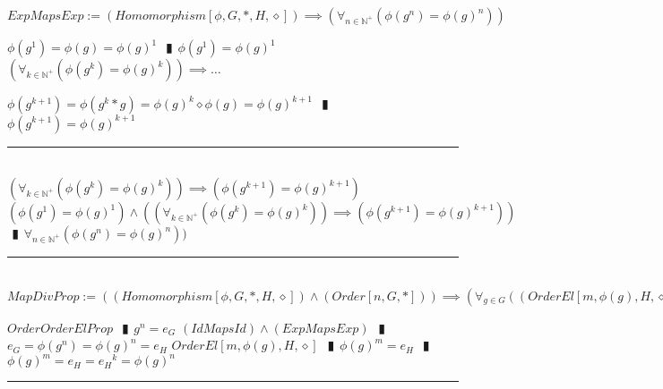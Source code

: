\documentclass{book}
\newcommand{\abr}{:=}
\newcommand{\pipe}{$\phantom{(}\vrectangleblack\phantom{)}$}
\newcommand{\pr}[1]{\left(#1\right)}
\begin{document}
$ExpMapsExp \abr (Homomorphism[\phi, G, *, H, \diamond]) \implies \pr{\forall_{n \in \mathbb{N}^+}\pr{\phi(g^n) = \phi(g)^n}}$
\begin{enumerate}
  \lit $\phi(g^1) = \phi(g) = \phi(g)^1$ \pipe $\phi(g^1) = \phi(g)^1$
  \lit $\pr{\forall_{k \in \mathbb{N}^+}\pr{\phi(g^k) = \phi(g)^k}} \implies \ldots$
  \begin{enumerate}
    \lit $\phi(g^{k + 1}) = \phi(g^k * g) = \phi(g)^k \diamond \phi(g) = \phi(g)^{k + 1}$ \pipe $\phi(g^{k + 1}) = \phi(g)^{k + 1}$
  \end{enumerate} \vspace{.75mm} \hrule \vspace{.75mm} \ \\ 
  \lit $\pr{\forall_{k \in \mathbb{N}^+}\pr{\phi(g^k) = \phi(g)^k}} \implies \pr{\phi(g^{k + 1}) = \phi(g)^{k + 1}}$
  \lit $\pr{\phi(g^1) = \phi(g)^1} \land \pr{\pr{\forall_{k \in \mathbb{N}^+}\pr{\phi(g^k) = \phi(g)^k}} \implies \pr{\phi(g^{k + 1}) = \phi(g)^{k + 1}}}$ \pipe $\forall_{n \in \mathbb{N}^+}\pr{\phi(g^n) = \phi(g)^n})$
\end{enumerate} \vspace{.75mm} \hrule \vspace{.75mm} \ \\ 

$MapDivProp \abr \pr{(Homomorphism[\phi, G, *, H, \diamond]) \land (Order[n, G, *])} \implies \pr{\forall_{g \in G}\pr{\pr{OrderEl[m, \phi(g), H, \diamond]} \implies (Divides[m, n])}}$
\begin{enumerate}
  \lit $OrderOrderElProp$ \pipe $g^n = e_G$
  \lit $(IdMapsId) \land (ExpMapsExp)$ \pipe $e_G = \phi(g^n) = \phi(g)^n = e_H$
  \lit $OrderEl[m, \phi(g), H, \diamond]$ \pipe $\phi(g)^m = e_H$ \pipe $\phi(g)^m = e_H = {e_H}^k = \phi(g)^n$
\end{enumerate} \vspace{.75mm} \hrule \vspace{.75mm} \ \\ 
\end{document}

